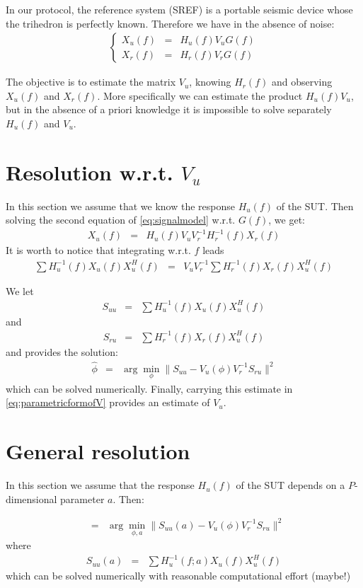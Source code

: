 \documentclass[a4paper, 12pt]{report}
\begin{document}
In our protocol, the  reference system (SREF) is a portable seismic device whose the trihedron  is perfectly known. 
Therefore we have in the absence of noise:
\begin{eqnarray}
\label{eq:signalmodel}
\left\{
\begin{array}{rcl}
X_{u}(f)&=&H_{u}(f)V_{u}G(f)
\\
X_{r}(f)&=&H_{r}(f)V_{r}G(f)
\end{array}
\right.
\end{eqnarray}

The objective is to estimate the matrix $V_{u}$, knowing $H_{r}(f)$ and observing $X_{u}(f)$ and $X_{r}(f)$.
More specifically we can estimate the product $H_{u}(f)V_{u}$, but in the absence of a priori knowledge it is impossible to solve separately $H_{u}(f)$ and $V_{u}$.


\section{Resolution w.r.t. $V_{u}$}
In this section we assume that we know the response $H_{u}(f)$ of the SUT. Then solving the second equation of \eqref{eq:signalmodel} w.r.t. $G(f)$, we get:
\begin{eqnarray*}
X_{u}(f)&=&H_{u}(f)V_{u}V_{r} ^{-1}H_{r}^{-1}(f)X_{r}(f)
\end{eqnarray*}
It is worth to notice that integrating w.r.t. $f$ leads
\begin{eqnarray*}
\sum H_{u}^{-1}(f)X_{u}(f)X_{u}^{H}(f)&=&V_{u}V_{r} ^{-1}\sum H_{r}^{-1}(f)X_{r}(f)X_{u}^{H}(f)
\end{eqnarray*}

We let 
\begin{eqnarray*}
S_{uu}&=&\sum H_{u}^{-1}(f)X_{u}(f)X_{u}^{H}(f)
\end{eqnarray*}
and
\begin{eqnarray*}
S_{ru}&=&\sum H_{r}^{-1}(f)X_{r}(f)X_{u}^{H}(f)
\end{eqnarray*}
and provides the solution:
\begin{eqnarray*}
\hat \phi &=& \arg\min_{\phi} \|S_{uu} - V_{u}(\phi)V_{r}^{-1}S_{ru}\|^{2}
\end{eqnarray*}
which can be solved numerically.
Finally, carrying this estimate in \eqref{eq:parametricformofV} provides an estimate of $V_{u}$.
\section{General resolution}
In this section we assume that the response $H_{u}(f)$ of the SUT depends on a $P$-dimensional parameter $a$.  Then:

\begin{eqnarray*}
[\hat \phi, \hat a] &=& \arg\min_{\phi, a} \|S_{uu}(a) - V_{u}(\phi)V_{r}^{-1}S_{ru}\|^{2}
\end{eqnarray*}
where 
\begin{eqnarray*}
S_{uu}(a) &=&
\sum H_{u}^{-1}(f;a)X_{u}(f)X_{u}^{H}(f)
\end{eqnarray*}
which can be solved numerically with reasonable computational effort (maybe!)
\end{document}

